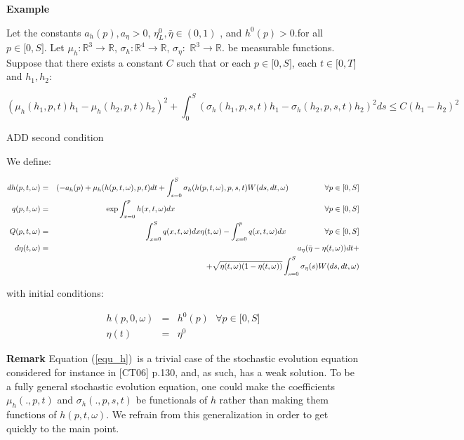 \documentclass{article}
\begin{document}
\textbf{Example}

Let the constants $a_{h}(p),a_{\eta }>0$, $\eta _{L}^{0},\bar{\eta}\in (0,1)$%
, and $h^{0}(p)>0$.for all $p\in \lbrack 0,S]$. Let $\mu _{h}:\mathbb{R}%
^{3}\rightarrow \mathbb{R}$, $\sigma _{h}:\mathbb{R}^{4}\rightarrow \mathbb{R%
}$, $\sigma _{\eta }:$ $\mathbb{R}^{3}\rightarrow \mathbb{R}$. be measurable
functions. Suppose that there exists a constant $C$ such that or each $p\in
\lbrack 0,S]$, each $t\in \lbrack 0,T]$ and $h_{1},h_{2}$:

\begin{equation*}
(\mu _{h}(h_{1},p,t)h_{1}-\mu _{h}(h_{2},p,t)h_{2})^{2}+\int_{0}^{S}(\sigma
_{h}(h_{1},p,s,t)h_{1}-\sigma _{h}(h_{2},p,s,t)h_{2})^{2}ds\leq
C(h_{1}-h_{2})^{2}
\end{equation*}

ADD second condition

\bigskip

We define:

\begin{eqnarray}
dh(p,t,\omega ) &=&(-a_{h}(p)+\mu _{h}(h(p,t,\omega
),p,t)dt+\int_{s=0}^{S}\sigma _{h}(h(p,t,\omega ),p,s,t)W(ds,dt,\omega )%
\text{ \ \ \ \ \ \ \ \ \ \ \ }\forall p\in \lbrack 0,S]  \label{equ_h_A} \\
q(p,t,\omega ) &=&\exp{\int_{x=0}^{p}h(x,t,\omega )dx}\text{ \ \ \ \ \ \ \ \ \
\ \ \ \ \ \ \ \ \ \ \ \ \ \ \ \ \ \ \ \ \ \ \ \ \ \ \ \ \ \ \ \ \ \ \ \ \ \
\ \ \ \ \ \ \ \ }\forall p\in \lbrack 0,S]  \label{equ_q_A} \\
Q(p,t,\omega ) &=&\int_{x=0}^{S}q(x,t,\omega )dx\eta (t,\omega
)-\int_{x=0}^{p}q(x,t,\omega )dx\text{ \ \ \ \ \ \ \ \ \ \ \ \ }\forall p\in
\lbrack 0,S]  \label{equ_Q_A} \\
d\eta (t,\omega ) &=&a_{\eta }(\bar{\eta}-\eta (t,\omega ))dt+
\label{equ_eta_A} \\
&&+\sqrt{\eta (t,\omega )(1-\eta (t,\omega ))}\int_{s=0}^{S}\sigma _{\eta
}(s)W(ds,dt,\omega )
\end{eqnarray}

with initial conditions:

\begin{eqnarray}
h(p,0,\omega ) &=&h^{0}(p)\text{ \ \ \ }\forall p\in \lbrack 0,S] \\
\eta (t) &=&\eta ^{0}
\end{eqnarray}

\textbf{Remark }Equation (\ref{equ_h})\ is a trivial case of the stochastic
evolution equation considered for instance in [CT06] p.130, and, as such,
has a weak solution. To be a fully general stochastic evolution equation,
one could make the coefficients $\mu _{h}(.,p,t)$ and $\sigma _{h}(.,p,s,t)$
be functionals of $h$ rather than making them functions of $h(p,t,\omega )$.
We refrain from this generalization in order to get quickly to the main
point.
\end{document}
